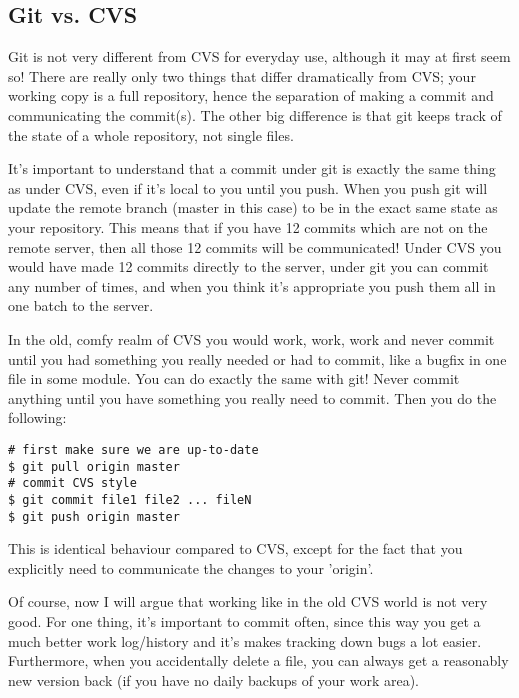 \documentclass[a4paper,10pt]{article}
\begin{document}
\subsection{Git vs. CVS}
Git is not very different from CVS for everyday use, although it may at first
seem so! There are really only two things that differ dramatically from CVS;
your working copy is a full repository, hence the separation of making a
commit and communicating the commit(s). The other big difference is that git
keeps track of the state of a whole repository, not single files.

It's important to understand that a commit under git is exactly the same thing
as under CVS, even if it's local to you until you push.  When you push git
will update the remote branch (master in this case) to be in the exact same
state as your repository. This means that if you have 12 commits which are not
on the remote server, then all those 12 commits will be communicated!  Under
CVS you would have made 12 commits directly to the server, under git you can
commit any number of times, and when you think it's appropriate you push them
all in one batch to the server. 

In the old, comfy realm of CVS you would work, work, work
and never commit until you had something you really needed or had to
commit, like a bugfix in one file in some module. You can do exactly the same
with git! Never commit anything until you have something you really
need to commit. Then you do the following:

\begin{verbatim}
# first make sure we are up-to-date
$ git pull origin master 
# commit CVS style
$ git commit file1 file2 ... fileN
$ git push origin master
\end{verbatim}

This is identical behaviour compared to CVS, except for the fact that you
explicitly need to communicate the changes to your 'origin'. 

Of course, now I will argue that working like in the old CVS world is
not very good. For one thing, it's important to commit often, since
this way you get a much better work log/history and it's makes tracking
down bugs a lot easier. Furthermore, when you accidentally delete a
file, you can always get a reasonably new version back (if you have no
daily backups of your work area). 
\end{document}
